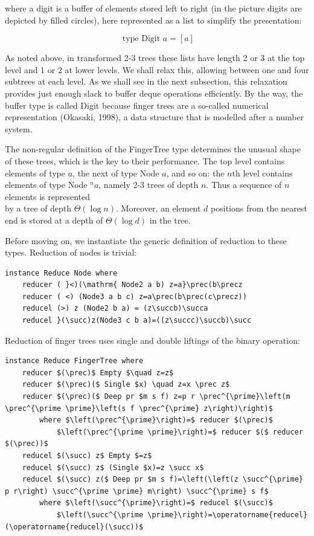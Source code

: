 \documentclass[10pt]{article}
\begin{document}
where a digit is a buffer of elements stored left to right (in the picture digits are depicted by filled circles), here represented as a list to simplify the presentation:

$$
\text { type Digit } a=[a]
$$

As noted above, in transformed 2-3 trees these lists have length 2 or 3 at the top level and 1 or 2 at lower levels. We shall relax this, allowing between one and four subtrees at each level. As we shall see in the next subsection, this relaxation provides just enough slack to buffer deque operations efficiently. By the way, the buffer type is called Digit because finger trees are a so-called numerical representation (Okasaki, 1998), a data structure that is modelled after a number system.

The non-regular definition of the FingerTree type determines the unusual shape of these trees, which is the key to their performance. The top level contains elements of type $a$, the next of type Node $a$, and so on: the $n$th level contains elements of type Node ${ }^{n} a$, namely 2-3 trees of depth $n$. Thus a sequence of $n$ elements is represented\\
by a tree of depth $\Theta(\log n)$. Moreover, an element $d$ positions from the nearest end is stored at a depth of $\Theta(\log d)$ in the tree.

Before moving on, we instantiate the generic definition of reduction to these types. Reduction of nodes is trivial:

\begin{verbatim}
instance Reduce Node where
    reducer ( }<)(\mathrm{ Node2 a b) z=a}\prec(b\precz
    reducer ( <) (Node3 a b c) z=a\prec(b\prec(c\precz))
    reducel (>) z (Node2 b a) = (z\succb)\succa
    reducel }(\succ)z(Node3 c b a)=((z\succc)\succb)\succ
\end{verbatim}

Reduction of finger trees uses single and double liftings of the binary operation:

\begin{verbatim}
instance Reduce FingerTree where
    reducer $(\prec)$ Empty $\quad z=z$
    reducer $(\prec)($ Single $x) \quad z=x \prec z$
    reducer $(\prec)($ Deep pr $m s f) z=p r \prec^{\prime}\left(m \prec^{\prime \prime}\left(s f \prec^{\prime} z\right)\right)$
        where $\left(\prec^{\prime}\right)=$ reducer $(\prec)$
            $\left(\prec^{\prime \prime}\right)=$ reducer $($ reducer $(\prec))$
    reducel $(\succ) z$ Empty $=z$
    reducel $(\succ) z$ (Single $x)=z \succ x$
    reducel $(\succ) z($ Deep pr $m s f)=\left(\left(z \succ^{\prime} p r\right) \succ^{\prime \prime} m\right) \succ^{\prime} s f$
        where $\left(\succ^{\prime}\right)=$ reducel $(\succ)$
            $\left(\succ^{\prime \prime}\right)=\operatorname{reducel}(\operatorname{reducel}(\succ))$
\end{verbatim}
\end{document}
